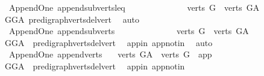 \begin{isabellebody}
{\isafoldproof}%
%
\isadelimproof
\isanewline
%
\endisadelimproof
\isanewline
{}\isamarkupfalse%
\ {\isacharparenleft}{\kern0pt}\ Append{\isacharunderscore}{\kern0pt}One{\isacharparenright}{\kern0pt}\ append{\isacharunderscore}{\kern0pt}subverts{\isacharunderscore}{\kern0pt}leq{\isacharcolon}{\kern0pt}\ \ \ \ \ \ \ \ \ \ \ \ \isanewline
\ \ {\isachardoublequoteopen}verts\ G\ {\isasymsubseteq}\ verts\ G{\isacharunderscore}{\kern0pt}A{\isachardoublequoteclose}\isanewline
%
\isadelimproof
\ \ %
\endisadelimproof
%
\isatagproof
{}\isamarkupfalse%
\ GG{\isacharunderscore}{\kern0pt}A\ pre{\isacharunderscore}{\kern0pt}digraph{\isachardot}{\kern0pt}verts{\isacharunderscore}{\kern0pt}del{\isacharunderscore}{\kern0pt}vert\ \isamarkupfalse%
\ auto%
\endisatagproof
{\isafoldproof}%
%
\isadelimproof
\isanewline
%
\endisadelimproof
\isanewline
{}\isamarkupfalse%
\ {\isacharparenleft}{\kern0pt}\ Append{\isacharunderscore}{\kern0pt}One{\isacharparenright}{\kern0pt}\ append{\isacharunderscore}{\kern0pt}subverts{\isacharcolon}{\kern0pt}\ \ \ \ \ \ \ \ \ \ \ \ \isanewline
\ \ {\isachardoublequoteopen}verts\ G\ {\isasymsubset}\ verts\ G{\isacharunderscore}{\kern0pt}A{\isachardoublequoteclose}\isanewline
%
\isadelimproof
\ \ %
\endisadelimproof
%
\isatagproof
{}\isamarkupfalse%
\ GG{\isacharunderscore}{\kern0pt}A\ \ pre{\isacharunderscore}{\kern0pt}digraph{\isachardot}{\kern0pt}verts{\isacharunderscore}{\kern0pt}del{\isacharunderscore}{\kern0pt}vert\ \isamarkupfalse%
\ app{\isacharunderscore}{\kern0pt}in\ app{\isacharunderscore}{\kern0pt}notin\ \isamarkupfalse%
\ auto%
\endisatagproof
{\isafoldproof}%
%
\isadelimproof
\isanewline
%
\endisadelimproof
\isanewline
{}\isamarkupfalse%
\ {\isacharparenleft}{\kern0pt}\ Append{\isacharunderscore}{\kern0pt}One{\isacharparenright}{\kern0pt}\ append{\isacharunderscore}{\kern0pt}verts{\isacharcolon}{\kern0pt}\ \isanewline
\ \ {\isachardoublequoteopen}verts\ G{\isacharunderscore}{\kern0pt}A\ {\isacharequal}{\kern0pt}\ verts\ G\ {\isasymunion}\ {\isacharbraceleft}{\kern0pt}app{\isacharbraceright}{\kern0pt}{\isachardoublequoteclose}\isanewline
%
\isadelimproof
\ \ %
\endisadelimproof
%
\isatagproof
{}\isamarkupfalse%
\ GG{\isacharunderscore}{\kern0pt}A\ \ pre{\isacharunderscore}{\kern0pt}digraph{\isachardot}{\kern0pt}verts{\isacharunderscore}{\kern0pt}del{\isacharunderscore}{\kern0pt}vert\ \isamarkupfalse%
\ app{\isacharunderscore}{\kern0pt}in\ app{\isacharunderscore}{\kern0pt}notin\ \isamarkupfalse%

\end{isabellebody}
